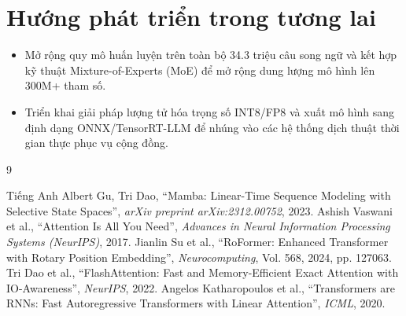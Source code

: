 \documentclass{uetgraduation}
\begin{document}
\section{Hướng phát triển trong tương lai}
\begin{itemize}
    \item Mở rộng quy mô huấn luyện trên toàn bộ 34.3 triệu câu song ngữ và kết hợp kỹ thuật Mixture-of-Experts (MoE) để mở rộng dung lượng mô hình lên 300M+ tham số.
    \item Triển khai giải pháp lượng tử hóa trọng số INT8/FP8 và xuất mô hình sang định dạng ONNX/TensorRT-LLM để nhúng vào các hệ thống dịch thuật thời gian thực phục vụ cộng đồng.
\end{itemize}

\begin{thebibliography}{9}
\begin{bibsection}{Tiếng Anh}
 Albert Gu, Tri Dao, ``Mamba: Linear-Time Sequence Modeling with Selective State Spaces'', \textit{arXiv preprint arXiv:2312.00752}, 2023.
 Ashish Vaswani et al., ``Attention Is All You Need'', \textit{Advances in Neural Information Processing Systems (NeurIPS)}, 2017.
 Jianlin Su et al., ``RoFormer: Enhanced Transformer with Rotary Position Embedding'', \textit{Neurocomputing}, Vol. 568, 2024, pp. 127063.
 Tri Dao et al., ``FlashAttention: Fast and Memory-Efficient Exact Attention with IO-Awareness'', \textit{NeurIPS}, 2022.
 Angelos Katharopoulos et al., ``Transformers are RNNs: Fast Autoregressive Transformers with Linear Attention'', \textit{ICML}, 2020.
\end{bibsection}
\end{thebibliography}
\end{document}
